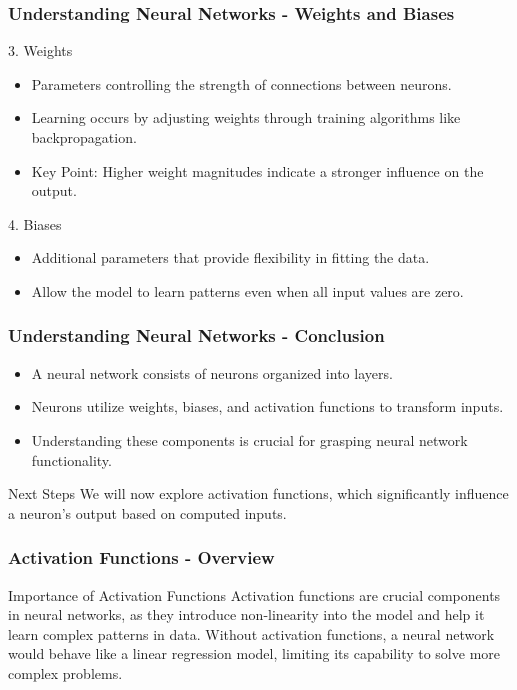 \documentclass{beamer}
\begin{document}
\begin{frame}[fragile]
    \frametitle{Understanding Neural Networks - Weights and Biases}
    \begin{block}{3. Weights}
        \begin{itemize}
            \item Parameters controlling the strength of connections between neurons.
            \item Learning occurs by adjusting weights through training algorithms like backpropagation.
            \item Key Point: Higher weight magnitudes indicate a stronger influence on the output.
        \end{itemize}
    \end{block}
    \begin{block}{4. Biases}
        \begin{itemize}
            \item Additional parameters that provide flexibility in fitting the data.
            \item Allow the model to learn patterns even when all input values are zero.
        \end{itemize}
    \end{block}
\end{frame}

\begin{frame}[fragile]
    \frametitle{Understanding Neural Networks - Conclusion}
    \begin{itemize}
        \item A neural network consists of neurons organized into layers.
        \item Neurons utilize weights, biases, and activation functions to transform inputs.
        \item Understanding these components is crucial for grasping neural network functionality.
    \end{itemize}
    \begin{block}{Next Steps}
        We will now explore activation functions, which significantly influence a neuron's output based on computed inputs.
    \end{block}
\end{frame}

\begin{frame}[fragile]
    \frametitle{Activation Functions - Overview}
    \begin{block}{Importance of Activation Functions}
        Activation functions are crucial components in neural networks, as they introduce non-linearity into the model and help it learn complex patterns in data. 
        Without activation functions, a neural network would behave like a linear regression model, limiting its capability to solve more complex problems.
    \end{block}
\end{frame}
\end{document}
